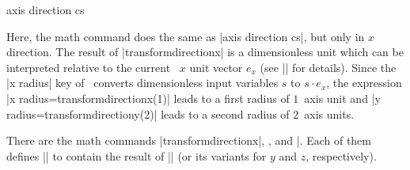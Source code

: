 \begin{coordinatesystem}{axis direction cs}
\begin{codeexample}[]
\end{codeexample}
	Here, the  math command does the same as |axis direction cs|, but only in $x$ direction. The result of |transformdirectionx| is a dimensionless unit which can be interpreted relative to the current \pgfname\ $x$ unit vector $e_x$ (see |\pgfplotstransformdirectionx| for details). Since the |x radius| key of \tikzname\ converts dimensionless input variables $s$ to $s \cdot e_x$, the expression |x radius=transformdirectionx(1)| leads to a first radius of $1$~axis unit and |y radius=transformdirectiony(2)| leads to a second radius of $2$~axis units.

	There are the math commands |transformdirectionx|, , and |. Each of them defines |\pgfmathresult| to contain the result of |\pgfplotstransformdirectionx| (or its variants for $y$ and $z$, respectively).
	
\end{coordinatesystem}


